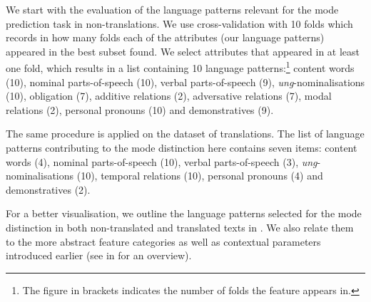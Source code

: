 \documentclass[output=paper,colorlinks,citecolor=brown]{langscibook}
\begin{document}
We start with the evaluation of the language patterns relevant for the mode prediction task in non-translations. %
We use cross-validation with 10 folds which records in how many folds each of the attributes (our language patterns) appeared in the best subset found. We select attributes that appeared in at least one fold, which results in a list containing 10 language patterns:\footnote{The figure in brackets indicates the number of folds the feature appears in.}  content words (10), nominal parts-of-speech (10), verbal parts-of-speech (9), \emph{ung}-nominalisations (10), obligation (7), additive relations (2), adversative relations (7), modal relations (2), personal pronouns (10) and demonstratives (9).


The same procedure is applied on the dataset of translations. The list of language patterns contributing to the mode distinction here contains seven items: content words (4), nominal parts-of-speech (10), verbal parts-of-speech (3), \emph{ung}-nominalisations (10), temporal relations (10), personal pronouns (4) and demonstratives (2).

For a better visualisation, we outline the language patterns selected for the mode distinction in both non-translated and translated texts in . We also relate them to the more abstract feature categories as well as contextual parameters introduced earlier (see  in  for an overview).
\end{document}

